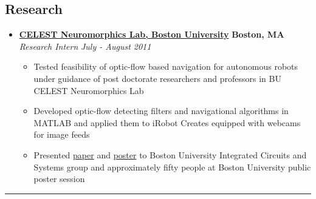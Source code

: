 \documentclass[10pt,letterpaper]{article}
\begin{document}
\subsection*{Research}
  \begin{itemize}
    \parskip=-0.1em

    \item[]
    {\href{http://nl.bu.edu/}{\textbf{CELEST Neuromorphics Lab, Boston University}} \hfill
      \textbf{Boston, MA}}
    \\
    {\emph{Research Intern} \hfill \emph{July - August 2011}}
	
	\begin{itemize}[label=\textbullet]
	\itemsep0em
	\item Tested feasibility of optic-flow based navigation for autonomous robots under guidance of post doctorate researchers and professors in BU CELEST Neuromorphics Lab
	\item Developed optic-flow detecting filters and navigational algorithms in MATLAB and applied them to iRobot Creates equipped with webcams for image feeds
	\item Presented \href{http://vincentkee.files.wordpress.com/2011/09/research-paper-the-final-draft.pdf}{paper} and \href{http://vincentkee.files.wordpress.com/2011/09/optic-flow-based-navigation-using-correlation-techniques.png}{poster} to Boston University Integrated Circuits and Systems group and approximately fifty people at Boston University public poster session
	\end{itemize}
\end{itemize}

\hrule
\vspace{-0.4em}
\end{document}
